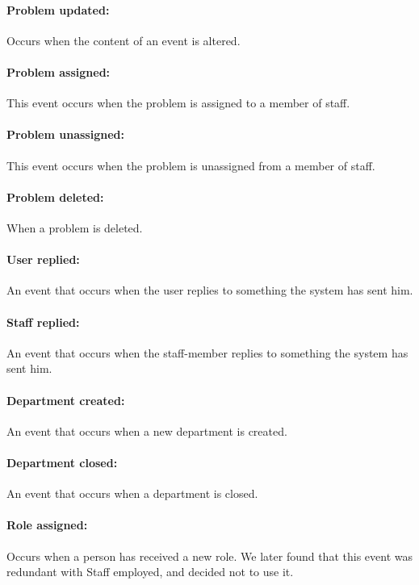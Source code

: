 \paragraph{Problem updated:}
Occurs when the content of an event is altered.

\paragraph{Problem assigned:}
This event occurs when the problem is assigned to a member of staff.

\paragraph{Problem unassigned:}
This event occurs when the problem is unassigned from a member of staff.

\paragraph{Problem deleted:}
When a problem is deleted. 

\paragraph{User replied:}
An event that occurs when the user replies to something the system has sent him.

\paragraph{Staff replied:}
An event that occurs when the staff-member replies to something the system has sent him.

\paragraph{Department created:}
An event that occurs when a new department is created.

\paragraph{Department closed:}
An event that occurs when a department is closed.

\paragraph{Role assigned:}
Occurs when a person has received a new role. We later found that this event was redundant with Staff employed, and decided not to use it.

